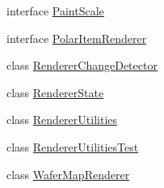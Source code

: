\begin{DoxyCompactItemize}
\item 
interface \mbox{\hyperlink{interfaceorg_1_1jfree_1_1chart_1_1renderer_1_1_paint_scale}{Paint\+Scale}}
\item 
interface \mbox{\hyperlink{interfaceorg_1_1jfree_1_1chart_1_1renderer_1_1_polar_item_renderer}{Polar\+Item\+Renderer}}
\item 
class \mbox{\hyperlink{classorg_1_1jfree_1_1chart_1_1renderer_1_1_renderer_change_detector}{Renderer\+Change\+Detector}}
\item 
class \mbox{\hyperlink{classorg_1_1jfree_1_1chart_1_1renderer_1_1_renderer_state}{Renderer\+State}}
\item 
class \mbox{\hyperlink{classorg_1_1jfree_1_1chart_1_1renderer_1_1_renderer_utilities}{Renderer\+Utilities}}
\item 
class \mbox{\hyperlink{classorg_1_1jfree_1_1chart_1_1renderer_1_1_renderer_utilities_test}{Renderer\+Utilities\+Test}}
\item 
class \mbox{\hyperlink{classorg_1_1jfree_1_1chart_1_1renderer_1_1_wafer_map_renderer}{Wafer\+Map\+Renderer}}
\end{DoxyCompactItemize}
